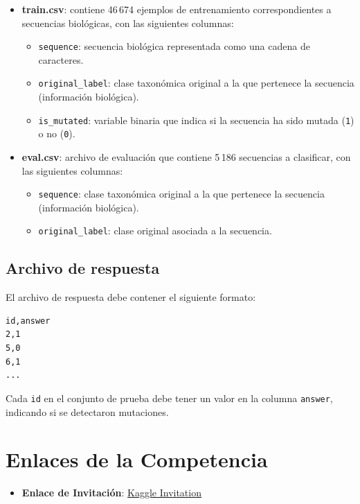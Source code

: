 \documentclass{article}
\begin{document}
\begin{itemize}
    \item \textbf{train.csv}: contiene 46\,674 ejemplos de entrenamiento correspondientes a secuencias biológicas, con las siguientes columnas:
    \begin{itemize}
        \item \texttt{sequence}: secuencia biológica representada como una cadena de caracteres.
        \item \texttt{original\_label}: clase taxonómica original a la que pertenece la secuencia (información biológica).
        \item \texttt{is\_mutated}: variable binaria que indica si la secuencia ha sido mutada (\texttt{1}) o no (\texttt{0}).
    \end{itemize}

    \item \textbf{eval.csv}: archivo de evaluación que contiene 5\,186 secuencias a clasificar, con las siguientes columnas:
    \begin{itemize}
        \item \texttt{sequence}: clase taxonómica original a la que pertenece la secuencia (información biológica).
        \item \texttt{original\_label}: clase original asociada a la secuencia.
    \end{itemize}
\end{itemize} 

\subsection{Archivo de respuesta}
El archivo de respuesta debe contener el siguiente formato:
\begin{verbatim}
id,answer
2,1
5,0
6,1
...
\end{verbatim}
Cada \texttt{id} en el conjunto de prueba debe tener un valor en la columna \texttt{answer}, indicando si se detectaron mutaciones.


\section{Enlaces de la Competencia}
\begin{itemize}
    \item \textbf{Enlace de Invitación}: \href{https://www.kaggle.com/t/e7bf9e2a56f242d8ac4443e2bfc1565f}{Kaggle Invitation}
\end{itemize}
\end{document}
